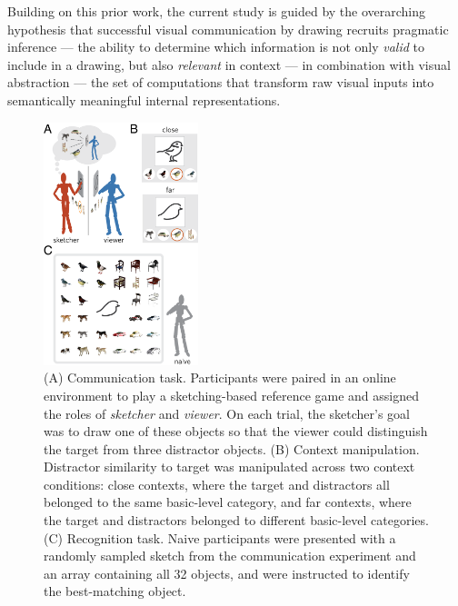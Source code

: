 \documentclass[9pt,twocolumn,twoside]{pnas-new}
\begin{document}
Building on this prior work, the current study is guided by the overarching hypothesis that successful visual communication by drawing recruits pragmatic inference \cite{goodman2016pragmatic,clark1996using,wilson1986relevance,grice1975syntax} --- the ability to determine which information is not only \textit{valid} to include in a drawing, but also \textit{relevant} in context --- in combination with visual abstraction --- the set of computations that transform raw visual inputs into semantically meaningful internal representations.

\begin{figure}[htbp]
\centering
\includegraphics[width=0.4\textwidth]{figures/1_task_display_alt.png}
\caption{(A) Communication task. Participants were paired in an online environment to play a sketching-based reference game and assigned the roles of \textit{sketcher} and \textit{viewer}. On each trial, the sketcher's goal was to draw one of these objects so that the viewer could distinguish the target from three distractor objects. (B) Context manipulation. Distractor similarity to target was manipulated across two context conditions: close contexts, where the target and distractors all belonged to the same basic-level category, and far contexts, where the target and distractors belonged to different basic-level categories. (C) Recognition task. Naive participants were presented with a randomly sampled sketch from the communication experiment and an array containing all 32 objects, and were instructed to identify the best-matching object.}
\label{task_display}
\end{figure}
\end{document}
